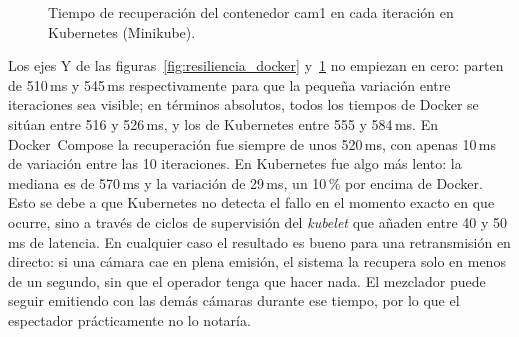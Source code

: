 \begin{figure}[H]
  \centering
  \caption{Tiempo de recuperación del contenedor cam1 en cada iteración
           en Kubernetes (Minikube).}
  \label{fig:resiliencia_k8s}
\end{figure}

Los ejes Y de las figuras~\ref{fig:resiliencia_docker}
y~\ref{fig:resiliencia_k8s} no empiezan en cero: parten de 510\,ms y 545\,ms
respectivamente para que la pequeña variación entre iteraciones sea visible;
en términos absolutos, todos los tiempos de Docker se sitúan entre 516 y 526\,ms,
y los de Kubernetes entre 555 y 584\,ms.
En Docker~Compose la recuperación fue siempre de unos 520\,ms, con apenas
10\,ms de variación entre las 10 iteraciones. En Kubernetes fue algo más
lento: la mediana es de 570\,ms y la variación de 29\,ms, un 10\,\% por encima
de Docker. Esto se debe a que Kubernetes no detecta el fallo en el momento
exacto en que ocurre, sino a través de ciclos de supervisión del
\textit{kubelet} que añaden entre 40 y 50\,ms de latencia.
En cualquier caso el resultado es bueno para una retransmisión en directo:
si una cámara cae en plena emisión, el sistema la recupera solo en menos de
un segundo, sin que el operador tenga que hacer nada. El mezclador puede
seguir emitiendo con las demás cámaras durante ese tiempo, por lo que el
espectador prácticamente no lo notaría.
